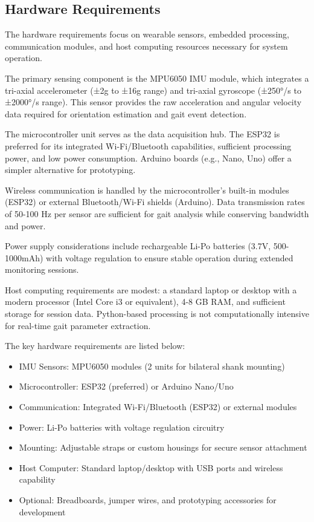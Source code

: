 \documentclass[12pt,a4paper]{report}
\begin{document}
\subsection{Hardware Requirements}

The hardware requirements focus on wearable sensors, embedded processing, communication modules, and host computing resources necessary for system operation.

The primary sensing component is the MPU6050 IMU module, which integrates a tri-axial accelerometer (±2g to ±16g range) and tri-axial gyroscope (±250°/s to ±2000°/s range). This sensor provides the raw acceleration and angular velocity data required for orientation estimation and gait event detection.

The microcontroller unit serves as the data acquisition hub. The ESP32 is preferred for its integrated Wi-Fi/Bluetooth capabilities, sufficient processing power, and low power consumption. Arduino boards (e.g., Nano, Uno) offer a simpler alternative for prototyping.

Wireless communication is handled by the microcontroller's built-in modules (ESP32) or external Bluetooth/Wi-Fi shields (Arduino). Data transmission rates of 50-100 Hz per sensor are sufficient for gait analysis while conserving bandwidth and power.

Power supply considerations include rechargeable Li-Po batteries (3.7V, 500-1000mAh) with voltage regulation to ensure stable operation during extended monitoring sessions.

Host computing requirements are modest: a standard laptop or desktop with a modern processor (Intel Core i3 or equivalent), 4-8 GB RAM, and sufficient storage for session data. Python-based processing is not computationally intensive for real-time gait parameter extraction.

The key hardware requirements are listed below:

\begin{itemize}
    \item IMU Sensors: MPU6050 modules (2 units for bilateral shank mounting)

    \item Microcontroller: ESP32 (preferred) or Arduino Nano/Uno

    \item Communication: Integrated Wi-Fi/Bluetooth (ESP32) or external modules

    \item Power: Li-Po batteries with voltage regulation circuitry

    \item Mounting: Adjustable straps or custom housings for secure sensor attachment

    \item Host Computer: Standard laptop/desktop with USB ports and wireless capability

    \item Optional: Breadboards, jumper wires, and prototyping accessories for development
\end{itemize}
\end{document}

